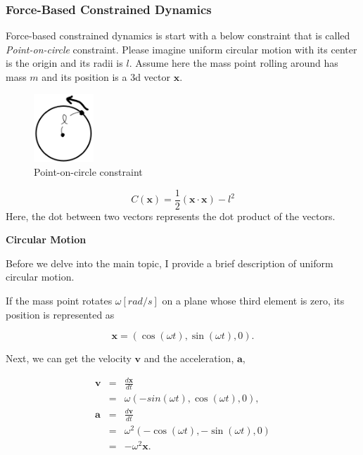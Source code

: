 \documentclass[pdflatex,sn-mathphys-num]{sn-jnl}%
\theoremstyle{thmstyleone}%
\theoremstyle{thmstyletwo}%
\theoremstyle{thmstylethree}%
\begin{document}
\subsubsection{Force-Based Constrained Dynamics}
\label{FBConstrained}
Force-based constrained dynamics is start with a below constraint that is called {\sl Point-on-circle} constraint. Please imagine uniform circular motion with its center is the origin and its radii is $l$. Assume here the mass point rolling around has mass $m$ and its position is a 3d vector $\boldsymbol{x}$. 

\begin{figure}[H]
	\centering
	\includegraphics[width=0.2\textwidth]{images/pocConstraint.png}
	\caption{Point-on-circle constraint}
	\label{pocConstraint}
\end{figure}

\begin{equation}
	C(\boldsymbol{x}) = \frac{1}{2}(\boldsymbol{x}\cdot\boldsymbol{x}) - l^2
\end{equation}
Here, the dot between two vectors represents the dot product of the vectors.

\textbf{\noindent Circular Motion}

Before we delve into the main topic, I provide a brief description of uniform circular motion.

If the mass point rotates $\omega [rad/s]$ on a plane whose third element is zero, its position is represented as

\begin{equation}
	\boldsymbol{x} = (\cos(\omega t),\sin(\omega t), 0).
\end{equation}

Next, we can get the velocity $\boldsymbol{v}$ and the acceleration, $\boldsymbol{a}$,

\begin{eqnarray}
	\boldsymbol{v} &=& \frac{d\boldsymbol{x}}{dt}\nonumber\\
	&=& \omega(-sin(\omega t), \cos(\omega t), 0),\\
	\boldsymbol{a} &=& \frac{d\boldsymbol{v}}{dt}\nonumber\\
	&=& \omega^2(-\cos(\omega t), -\sin(\omega t), 0)\nonumber\\
	&=& -\omega^2\boldsymbol{x}.
\end{eqnarray}
\end{document}
